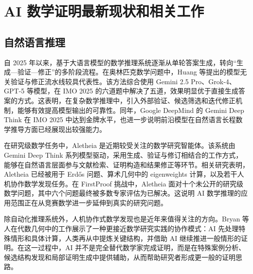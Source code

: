 \newpage
{}
\section{AI 数学证明最新现状和相关工作}

\subsection{自然语言推理}

自 2025 年以来，基于大语言模型的数学推理系统逐渐从单轮答案生成，转向“生成—验证—修正”的多阶段流程。在奥林匹克数学问题中，Huang 等提出的模型无关验证与修正流水线较具代表性。该方法综合使用 Gemini 2.5 Pro、Grok-4、GPT-5 等模型，在 IMO 2025 的六道题中解决了五道，效果明显优于直接生成答案的方式。这表明，在复杂数学推理中，引入外部验证、候选筛选和迭代修正机制，能够有效提高模型输出的可靠性\cite{Huang2025IMO}。同年，Google DeepMind 的 Gemini Deep Think 在 IMO 2025 中达到金牌水平，也进一步说明前沿模型在自然语言长程数学推导方面已经展现出较强能力\cite{DeepMind2025IMO}。

在研究级数学任务中，Aletheia 是近期较受关注的数学研究智能体。该系统由 Gemini Deep Think 系列模型驱动，采用生成、验证与修订相结合的工作方式，能够在自然语言层面参与文献检索、证明构造和结果修正等环节。相关研究表明，Aletheia 已经被用于 Erdős 问题、算术几何中的 eigenweights 计算，以及若干人机协作数学发现任务\cite{Feng2026AutonomousMath}。在 FirstProof 挑战中，Aletheia 面对十个未公开的研究级数学问题，其中六个问题最终被多数专家评估为已解决\cite{Feng2026FirstProof}。这说明 AI 数学推理的应用范围正在从竞赛数学进一步延伸到真实的研究问题。

除自动化推理系统外，人机协作式数学发现也是近年来值得关注的方向。Bryan 等人在代数几何中的工作展示了一种更接近数学研究实践的协作模式：AI 先处理特殊情形和具体计算，人类再从中提炼关键结构，并借助 AI 继续推进一般情形的证明。在这一过程中，AI 并不是完全替代数学家完成证明，而是在特殊案例分析、候选结构发现和局部证明生成中提供辅助，从而帮助研究者形成更一般的证明思路\cite{Bryan2026Motivic}。

